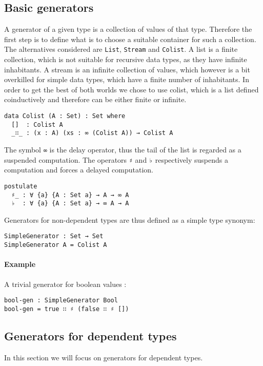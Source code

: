 \documentclass[10pt,a4paper]{article}
\begin{document}
\subsection{Basic generators}
A generator of a given type is a collection of values of that type.
Therefore the first step is to define what is to choose a suitable container for such a collection. The alternatives considered are \texttt{List}, \texttt{Stream} and \texttt{Colist}. A list is a finite collection, which is not suitable for recursive data types, as they have infinite inhabitants. A stream is an infinite collection of values, which however is a bit overkilled for simple data types, which have a finite number of inhabitants. In order to get the best of both worlds we chose to use colist, which is a list defined coinductively and therefore can be either finite or infinite.

\begin{verbatim}
data Colist (A : Set) : Set where
  []  : Colist A
  _∷_ : (x : A) (xs : ∞ (Colist A)) → Colist A
\end{verbatim}
The symbol \texttt{∞} is the delay operator, thus the tail of the list is regarded as a suspended computation. The operators \texttt{♯} and \texttt{♭} respectively suspends a computation and forces a delayed computation.
\begin{verbatim}
postulate
  ♯_ : ∀ {a} {A : Set a} → A → ∞ A
  ♭  : ∀ {a} {A : Set a} → ∞ A → A
\end{verbatim}  
Generators for non-dependent types are thus defined as a simple type synonym:
\begin{verbatim}
SimpleGenerator : Set → Set
SimpleGenerator A = Colist A
\end{verbatim}

\paragraph{Example}
A trivial generator for boolean values : 
\begin{verbatim}
bool-gen : SimpleGenerator Bool
bool-gen = true ∷ ♯ (false ∷ ♯ [])
\end{verbatim}

\subsection{Generators for dependent types}
In this section we will focus on generators for dependent types.
\end{document}
